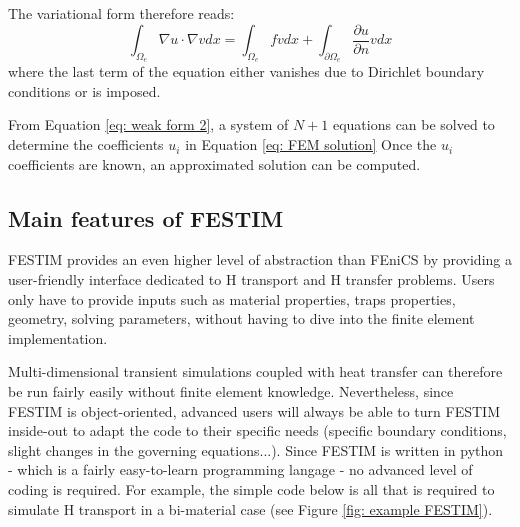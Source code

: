 The variational form therefore reads:
\begin{equation}
    \int_{\Omega_e} \nabla u \cdot \nabla v dx = \int_{\Omega_e} f v dx + \int_{\partial \Omega_e} \frac{\partial u}{\partial n} v dx
    \label{eq: weak form 2}
\end{equation}
where the last term of the equation either vanishes due to Dirichlet boundary conditions or is imposed.

From Equation \ref{eq: weak form 2}, a system of $N+1$ equations can be solved to determine the coefficients $u_i$ in Equation \ref{eq: FEM solution}
Once the $u_i$ coefficients are known, an approximated solution can be computed.

\subsection{Main features of FESTIM}
FESTIM provides an even higher level of abstraction than FEniCS by providing a user-friendly interface dedicated to H transport and H transfer problems.
Users only have to provide inputs such as material properties, traps properties, geometry, solving parameters, without having to dive into the finite element implementation.

Multi-dimensional transient simulations coupled with heat transfer can therefore be run fairly easily without finite element knowledge.
Nevertheless, since FESTIM is object-oriented, advanced users will always be able to turn FESTIM inside-out to adapt the code to their specific needs (specific boundary conditions, slight changes in the governing equations...).
Since FESTIM is written in python - which is a fairly easy-to-learn programming langage - no advanced level of coding is required.
For example, the simple code below is all that is required to simulate H transport in a bi-material case (see Figure \ref{fig: example FESTIM}).


